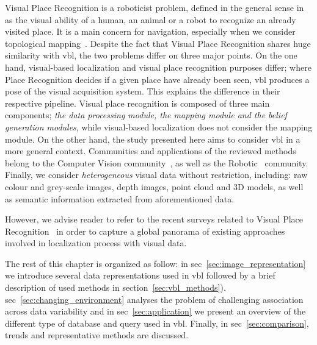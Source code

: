 		Visual Place Recognition is a roboticist problem, defined in the general sense in~\citep{Lowry2016} as the visual ability of a human, an animal or a robot to recognize an already visited place. It is a main concern for navigation, especially when we consider topological mapping~\citep{Garcia-Fidalgo2015}. Despite the fact that Visual Place Recognition shares huge similarity with \ac{vbl}, the two problems differ on three major points. On the one hand, visual-based localization and visual place recognition purposes differ; where Place Recognition decides if a given place have already been seen, \ac{vbl} produces a pose of the visual acquisition system. This explains the difference in their respective pipeline. Visual place recognition is composed of three main components; \textit{the data processing module, the mapping module and the belief generation modules}, while visual-based localization does not consider the mapping module. On the other hand, the study presented here aims to consider \ac{vbl} in a more general context. Communities and applications of the reviewed methods belong to the Computer Vision community~\citep{Sattler2011}, as well as the Robotic~\citep{Garcia-Fidalgo2015} community. Finally, we consider \textit{heterogeneous} visual data without restriction, including: raw colour and grey-scale images, depth images, point cloud and 3D models, as well as semantic information extracted from aforementioned data. 
	
		However, we advise reader to refer to the recent surveys related to Visual Place Recognition~\citep{Lowry2016,Garcia-Fidalgo2015,Kostavelis2015} in order to capture a global panorama of existing approaches involved in localization process with visual data.		

		\bigskip
		The rest of this chapter is organized as follow: in \acl*{sec}~\ref{sec:image_representation} we introduce several data representations used in \ac{vbl} followed by a brief description of used methods in section~\ref{sec:vbl_methods}).  \acs{sec}~\ref{sec:changing_environment} analyses the problem of challenging association across data variability and in  \acl{sec}~\ref{sec:application} we present an overview of the different type of database and query used in \ac{vbl}. Finally, in  \acl{sec}~\ref{sec:comparison}, trends and representative methods are discussed.